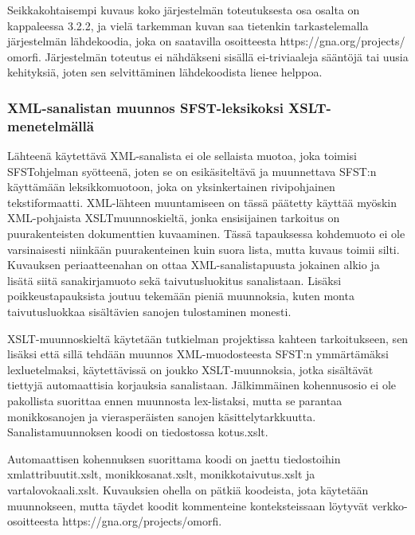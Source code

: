 \documentclass[free]{flammie}
\begin{document}
Seikkakohtaisempi kuvaus koko järjestelmän toteutuksesta osa osalta on kappaleessa 3.2.2, ja vielä tarkemman kuvan saa tietenkin tarkastelemalla järjestelmän
lähdekoodia, joka on saatavilla osoitteesta https://gna.org/projects/
omorfi. Järjestelmän toteutus ei nähdäkseni sisällä ei-triviaaleja sääntöjä tai
uusia kehityksiä, joten sen selvittäminen lähdekoodista lienee helppoa.


\subsubsection{XML-sanalistan muunnos SFST-leksikoksi XSLT-menetelmällä}

Lähteenä käytettävä XML-sanalista ei ole sellaista muotoa, joka toimisi SFSTohjelman syötteenä, joten se on esikäsiteltävä ja muunnettava SFST:n käyttämään
leksikkomuotoon, joka on yksinkertainen rivipohjainen tekstiformaatti. XML-lähteen muuntamiseen on tässä päätetty käyttää myöskin XML-pohjaista XSLTmuunnoskieltä, jonka ensisijainen tarkoitus on puurakenteisten dokumenttien kuvaaminen. Tässä tapauksessa kohdemuoto ei ole varsinaisesti niinkään puurakenteinen kuin suora lista, mutta kuvaus toimii silti. Kuvauksen periaatteenahan
on ottaa XML-sanalistapuusta jokainen alkio ja lisätä siitä sanakirjamuoto sekä
taivutusluokitus sanalistaan. Lisäksi poikkeustapauksista joutuu tekemään pieniä
muunnoksia, kuten monta taivutusluokkaa sisältävien sanojen tulostaminen monesti.

XSLT-muunnoskieltä käytetään tutkielman projektissa kahteen tarkoitukseen, sen
lisäksi että sillä tehdään muunnos XML-muodosteesta SFST:n ymmärtämäksi lexluetelmaksi, käytettävissä on joukko XSLT-muunnoksia, jotka sisältävät tiettyjä
automaattisia korjauksia sanalistaan. Jälkimmäinen kohennusosio ei ole pakollista suorittaa ennen muunnosta lex-listaksi, mutta se parantaa monikkosanojen
ja vierasperäisten sanojen käsittelytarkkuutta. Sanalistamuunnoksen koodi on tiedostossa kotus.xslt.

Automaattisen kohennuksen suorittama koodi on jaettu tiedostoihin
xmlattribuutit.xslt, monikkosanat.xslt, monikkotaivutus.xslt ja
vartalovokaali.xslt.  Kuvauksien ohella on pätkiä koodeista, jota käytetään
muunnokseen, mutta täydet koodit kommenteine konteksteissaan löytyvät
verkko-osoitteesta https://gna.org/projects/omorfi.
\end{document}
